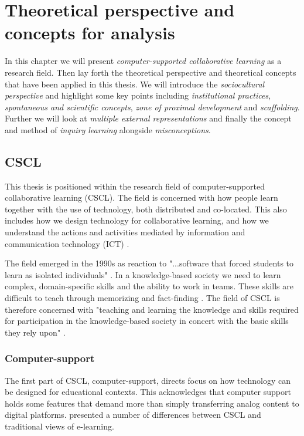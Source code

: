 \chapter{Theoretical perspective and concepts for analysis}

In this chapter we will present \emph{computer-supported collaborative learning} as a research field. Then lay forth the theoretical perspective and theoretical concepts that have been applied in this thesis. We will introduce the \emph{sociocultural perspective} and highlight some key points including \emph{institutional practices}, \emph{spontaneous and scientific concepts}, \emph{zone of proximal development} and \emph{scaffolding}. Further we will look at \emph{multiple external representations} and finally the concept and method of \emph{inquiry learning} alongside \emph{misconceptions}.

\section{CSCL}
This thesis is positioned within the research field of computer-supported collaborative learning (CSCL). The field is concerned with how people learn together with the use of technology, both distributed and co-located. This also includes how we design technology for collaborative learning, and how we understand the actions and activities mediated by information and communication technology (ICT) \citep{stahl2006computer,ludvigsen2010computer}.  

The field emerged in the 1990s as reaction to "...software that forced students to learn as isolated individuals" \citep{stahl2006computer}. In a knowledge-based society we need to learn complex, domain-specific skills and the ability to work in teams. These skills are difficult to teach through memorizing and fact-finding \citep{sfard1998two,ludvigsen2010computer}. The field of CSCL is therefore concerned with "teaching and learning the knowledge and skills required for participation in the knowledge-based society in concert with the basic skills they rely upon" \citep[p. 2]{ludvigsen2010computer}.

\subsection{Computer-support}
The first part of CSCL, computer-support, directs focus on how technology can be designed for educational contexts. This acknowledges that computer support holds some features that demand more than simply transferring analog content to digital platforms. \citet{stahl2006computer} presented a number of differences between CSCL and traditional views of e-learning. 

